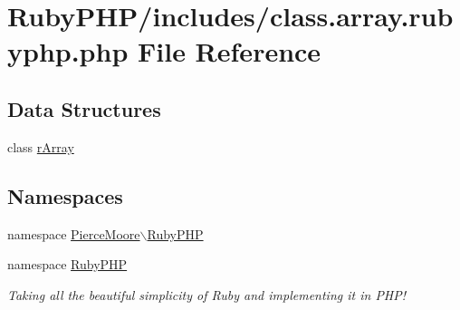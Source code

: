 \hypertarget{class_8array_8rubyphp_8php}{\section{Ruby\-P\-H\-P/includes/class.array.\-rubyphp.\-php File Reference}
\label{class_8array_8rubyphp_8php}
}
\subsection*{Data Structures}
\begin{DoxyCompactItemize}
\item 
class \hyperlink{class_pierce_moore_1_1_ruby_p_h_p_1_1r_array}{r\-Array}
\end{DoxyCompactItemize}
\subsection*{Namespaces}
\begin{DoxyCompactItemize}
\item 
namespace \hyperlink{namespace_pierce_moore_1_1_ruby_p_h_p}{Pierce\-Moore$\backslash$\-Ruby\-P\-H\-P}
\item 
namespace \hyperlink{namespace_ruby_p_h_p}{Ruby\-P\-H\-P}
\begin{DoxyCompactList}\small\item\em Taking all the beautiful simplicity of Ruby and implementing it in P\-H\-P! \end{DoxyCompactList}\end{DoxyCompactItemize}

